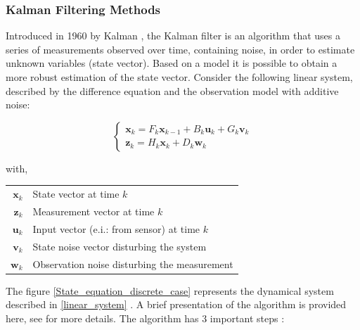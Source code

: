 \documentclass[conference]{IEEEtran}
\begin{document}
\subsubsection{Kalman Filtering Methods}


Introduced in 1960 by Kalman \cite{kalman_new_1960}, the Kalman filter is an algorithm that uses a series of measurements observed over time, containing noise, in order to estimate unknown variables (state vector). %
Based on a model it is possible to obtain a more robust estimation of the state vector. Consider the following linear system, described by the difference equation and the observation model with additive noise:


\begin{equation}
\left\{ \begin{array}{l}
\textbf{x}_{k} = F_{k}\textbf{x}_{k-1}+B_{k}\textbf{u}_{k}+G_{k}\textbf{v}_{k}\\
\textbf{z}_{k} = H_{k}\textbf{x}_{k}+D_{k}\textbf{w}_{k}
\end{array} \right.
\label{linear_system}
\end{equation}

with,

\begin{center}
\begin{tabular}{rl}
$\textbf{x}_{k} $ &State vector at time $k$\\
$\textbf{z}_{k} $ &Measurement vector at time $k$\\
$\textbf{u}_{k} $ & Input vector (e.i.: from sensor) at time $k$ \\
$\textbf{v}_{k} $ & State noise vector disturbing the system\\
$\textbf{w}_{k} $ & Observation noise disturbing the measurement\\
\end{tabular}
\end{center}

\vspace{0.2cm}


The figure \ref{State_equation_discrete_case} represents the dynamical system described in \ref{linear_system} . A brief presentation of the algorithm is provided here,  see \cite{terejanu2013discrete} for more details. The algorithm has 3 important steps :\\
\end{document}
